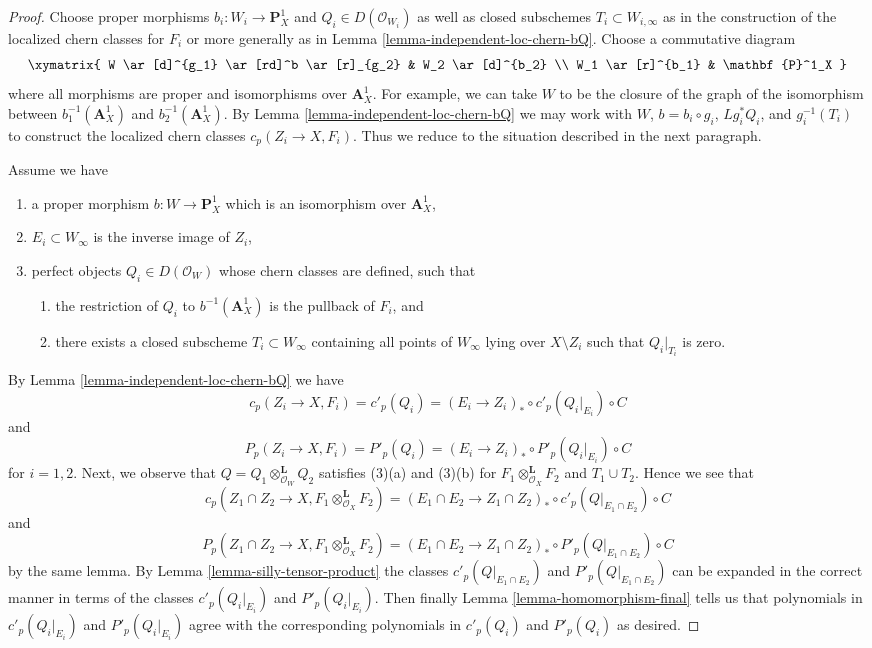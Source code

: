 \begin{proof}
Choose proper morphisms $b_i : W_i \to \mathbf{P}^1_X$ and
$Q_i \in D(\mathcal{O}_{W_i})$ as well as closed subschemes
$T_i \subset W_{i, \infty}$ as in the construction of
the localized chern classes for $F_i$ or more generally as in
Lemma \ref{lemma-independent-loc-chern-bQ}. Choose a commutative
diagram
$$
\xymatrix{
W \ar[d]^{g_1} \ar[rd]^b \ar[r]_{g_2} & W_2 \ar[d]^{b_2} \\
W_1 \ar[r]^{b_1} & \mathbf{P}^1_X
}
$$
where all morphisms are proper and isomorphisms over
$\mathbf{A}^1_X$. For example, we can take $W$ to be the closure
of the graph of the isomorphism between
$b_1^{-1}(\mathbf{A}^1_X)$ and $b_2^{-1}(\mathbf{A}^1_X)$.
By Lemma \ref{lemma-independent-loc-chern-bQ} we may work with
$W$, $b = b_i \circ g_i$, $Lg_i^*Q_i$, and
$g_i^{-1}(T_i)$ to construct the localized chern classes
$c_p(Z_i \to X, F_i)$. Thus we reduce to the situation described
in the next paragraph.

\medskip\noindent
Assume we have
\begin{enumerate}
\item a proper morphism $b : W \to \mathbf{P}^1_X$ which is an isomorphism
over $\mathbf{A}^1_X$,
\item $E_i \subset W_\infty$ is the inverse image of $Z_i$,
\item perfect objects $Q_i \in D(\mathcal{O}_W)$ whose chern classes
are defined, such that
\begin{enumerate}
\item the restriction of $Q_i$ to $b^{-1}(\mathbf{A}^1_X)$ is
the pullback of $F_i$, and
\item there exists a closed subscheme $T_i \subset W_\infty$ containing
all points of $W_\infty$ lying over $X \setminus Z_i$ such that
$Q_i|_{T_i}$ is zero.
\end{enumerate}
\end{enumerate}
By Lemma \ref{lemma-independent-loc-chern-bQ} we have
$$
c_p(Z_i \to X, F_i) = c'_p(Q_i) =
(E_i \to Z_i)_* \circ c'_p(Q_i|_{E_i}) \circ C
$$
and
$$
P_p(Z_i \to X, F_i) = P'_p(Q_i) =
(E_i \to Z_i)_* \circ P'_p(Q_i|_{E_i}) \circ C
$$
for $i = 1, 2$. Next, we observe that
$Q = Q_1 \otimes_{\mathcal{O}_W}^\mathbf{L} Q_2$
satisfies (3)(a) and (3)(b) for $F_1 \otimes_{\mathcal{O}_X}^\mathbf{L} F_2$
and $T_1 \cup T_2$. Hence we see that
$$
c_p(Z_1 \cap Z_2 \to X, F_1 \otimes_{\mathcal{O}_X}^\mathbf{L} F_2) =
(E_1 \cap E_2 \to Z_1 \cap Z_2)_* \circ
c'_p(Q|_{E_1 \cap E_2}) \circ C
$$
and
$$
P_p(Z_1 \cap Z_2 \to X, F_1 \otimes_{\mathcal{O}_X}^\mathbf{L} F_2) =
(E_1 \cap E_2 \to Z_1 \cap Z_2)_* \circ
P'_p(Q|_{E_1 \cap E_2}) \circ C
$$
by the same lemma. By Lemma \ref{lemma-silly-tensor-product}
the classes $c'_p(Q|_{E_1 \cap E_2})$ and $P'_p(Q|_{E_1 \cap E_2})$
can be expanded in the correct manner in terms of the classes
$c'_p(Q_i|_{E_i})$ and $P'_p(Q_i|_{E_i})$. Then finally
Lemma \ref{lemma-homomorphism-final}
tells us that polynomials in $c'_p(Q_i|_{E_i})$ and $P'_p(Q_i|_{E_i})$
agree with the corresponding polynomials in
$c'_p(Q_i)$ and $P'_p(Q_i)$ as desired.
\end{proof}






